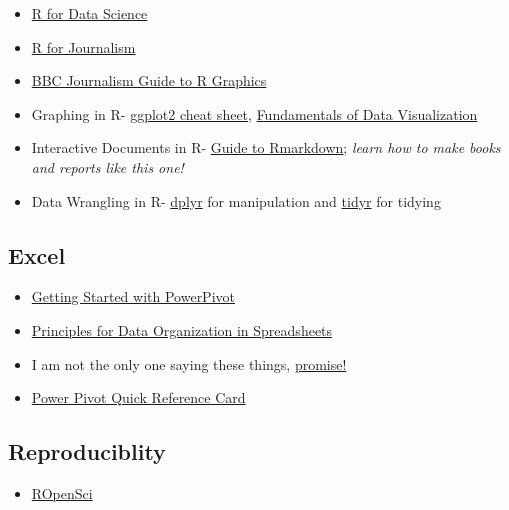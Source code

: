\documentclass[
]{book}
\providecommand{\tightlist}{%
  \setlength{\itemsep}{0pt}\setlength{\parskip}{0pt}}
\begin{document}
\begin{itemize}
\tightlist
\item
  \href{https://r4ds.had.co.nz/}{R for Data Science}
\item
  \href{https://learn.r-journalism.com/en/}{R for Journalism}
\item
  \href{https://bbc.github.io/rcookbook/}{BBC Journalism Guide to R Graphics}
\item
  Graphing in R- \href{https://rstudio.com/wp-content/uploads/2015/03/ggplot2-cheatsheet.pdf}{ggplot2 cheat sheet}, \href{https://serialmentor.com/dataviz/}{Fundamentals of Data Visualization}
\item
  Interactive Documents in R- \href{https://bookdown.org/yihui/rmarkdown/}{Guide to Rmarkdown}; \emph{learn how to make books and reports like this one!}
\item
  Data Wrangling in R- \href{https://dplyr.tidyverse.org/}{dplyr} for manipulation and \href{https://github.com/tyleransom/EconometricsLabs/blob/master/tidyRcheatsheet.pdf}{tidyr} for tidying
\end{itemize}

\hypertarget{excel}{%
\subsection{Excel}\label{excel}}

\begin{itemize}
\tightlist
\item
  \href{https://support.office.com/en-us/article/get-started-with-power-pivot-in-microsoft-excel-fdfcf944-7876-424a-8437-1a6c1043a80b}{Getting Started with PowerPivot}
\item
  \href{https://www.tandfonline.com/doi/full/10.1080/00031305.2017.1375989}{Principles for Data Organization in Spreadsheets}
\item
  I am not the only one saying these things, \href{https://towardsdatascience.com/microsoft-excel-in-the-era-of-big-data-401e67ca28a5}{promise!}
\item
  \href{https://powerpivotpro.com/2015/10/giving-back-steal-this-reference-card/\#downloads}{Power Pivot Quick Reference Card}
\end{itemize}

\hypertarget{reproduciblity}{%
\subsection{Reproduciblity}\label{reproduciblity}}

\begin{itemize}
\tightlist
\item
  \href{https://ropensci.org}{ROpenSci}
\end{itemize}

  
\end{document}
